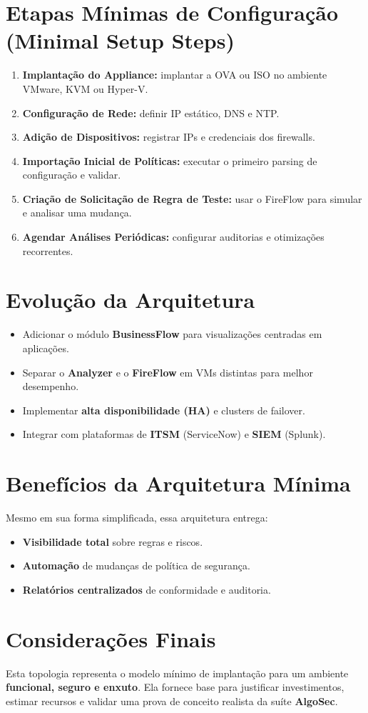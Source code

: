 \documentclass[a4paper,12pt]{article}
\begin{document}
\section*{ Etapas Mínimas de Configuração (Minimal Setup Steps)}
\begin{enumerate}[leftmargin=1.5cm]
    \item \textbf{Implantação do Appliance:} implantar a OVA ou ISO no ambiente VMware, KVM ou Hyper-V.
    \item \textbf{Configuração de Rede:} definir IP estático, DNS e NTP.
    \item \textbf{Adição de Dispositivos:} registrar IPs e credenciais dos firewalls.
    \item \textbf{Importação Inicial de Políticas:} executar o primeiro parsing de configuração e validar.
    \item \textbf{Criação de Solicitação de Regra de Teste:} usar o FireFlow para simular e analisar uma mudança.
    \item \textbf{Agendar Análises Periódicas:} configurar auditorias e otimizações recorrentes.
\end{enumerate}

\section*{Evolução da Arquitetura}
\begin{itemize}[leftmargin=1.5cm]
    \item Adicionar o módulo \textbf{BusinessFlow} para visualizações centradas em aplicações.
    \item Separar o \textbf{Analyzer} e o \textbf{FireFlow} em VMs distintas para melhor desempenho.
    \item Implementar \textbf{alta disponibilidade (HA)} e clusters de failover.
    \item Integrar com plataformas de \textbf{ITSM} (ServiceNow) e \textbf{SIEM} (Splunk).
\end{itemize}

\section*{Benefícios da Arquitetura Mínima}
Mesmo em sua forma simplificada, essa arquitetura entrega:
\begin{itemize}[leftmargin=1.5cm]
    \item \textbf{Visibilidade total} sobre regras e riscos.
    \item \textbf{Automação} de mudanças de política de segurança.
    \item \textbf{Relatórios centralizados} de conformidade e auditoria.
\end{itemize}
\section*{ Considerações Finais}
Esta topologia representa o modelo mínimo de implantação para um ambiente \textbf{funcional, seguro e enxuto}.  
Ela fornece base para justificar investimentos, estimar recursos e validar uma prova de conceito realista da suíte \textbf{AlgoSec}.
\end{document}
